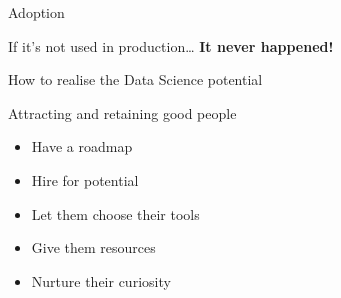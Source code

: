 \documentclass[12pt,aspectratio=169]{beamer}
\begin{document}
\begin{frame}{Adoption}
    \begin{center}
        {\Large%
         If it's not used in production\ldots}
        \vfill\pause
        {\LARGE\bf%
         It never happened!}
    \end{center}
\end{frame}

\begin{frame}{How to realise the Data Science potential}
\end{frame}

\begin{frame}{Attracting and retaining good people}
    \Large%
    \begin{itemize}
        \setlength{\itemsep}{\medskipamount}
        \item Have a roadmap
        \item Hire for potential
        \item Let them choose their tools
        \item Give them resources
        \item Nurture their curiosity
    \end{itemize}
\end{frame}
\end{document}
